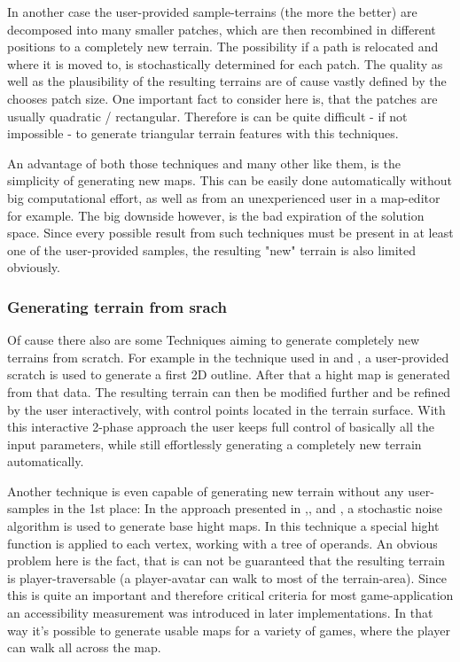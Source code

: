 In another case \cite{raffe2011evolving} the user-provided sample-terrains (the more the better) are decomposed into many smaller patches, which are then recombined in different positions to a completely new terrain. The possibility if a path is relocated and where it is moved to, is stochastically determined for each patch. The quality as well as the plausibility of the resulting terrains are of cause vastly defined by the chooses patch size. One important fact to consider here is, that the patches are usually quadratic / rectangular. Therefore is can be quite difficult - if not impossible - to generate triangular terrain features with this techniques.

An advantage of both those techniques and many other like them, is the simplicity of generating new maps. This can be easily done automatically without big computational effort, as well as from an unexperienced user in a map-editor for example. The big downside however, is the bad expiration of the solution space. Since every possible result from such techniques must be present in at least one of the user-provided samples, the resulting "new" terrain is also limited obviously.

\subsubsection{Generating terrain from srach}
Of cause there also are some Techniques aiming to generate completely new terrains from scratch. For example in the technique used in \cite{ong2005terrain} and \cite{saunders2006realistic}, a user-provided scratch is used to generate a first 2D outline. After that a hight map is generated from that data. The resulting terrain can then be modified further and be refined by the user interactively, with control points located in the terrain surface. With this interactive 2-phase approach the user keeps full control of basically all the input parameters, while still effortlessly generating a completely new terrain automatically.

Another technique is even capable of generating new terrain without any user-samples in the 1st place: In the approach presented in \cite{frade2009breeding},\cite{frade2010evolution1},\cite{frade2010evolution2} and \cite{rodrigues2010development}, a stochastic noise algorithm is used to generate base hight maps. In this technique a special hight function is applied to each vertex, working with a tree of operands. An obvious problem here is the fact, that is can not be guaranteed that the resulting terrain is player-traversable (a player-avatar can walk to most of the terrain-area). Since this is quite an important and therefore critical criteria for most game-application an accessibility measurement was introduced in later implementations. In that way it's possible to generate usable maps for a variety of games, where the player can walk all across the map.

